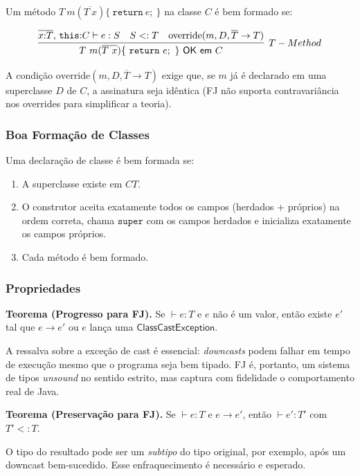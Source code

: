 Um método \(T\ m(\overline{T\ x})\{\ \mathtt{return}\ e;\ \}\) na
classe \(C\) é bem formado se:

\[ \infer[T-Method]{T\ m(\overline{T\ x})\{\ \mathtt{return}\ e;\ \}\
  \mathsf{OK}\ \mathsf{em}\ C}{\overline{x {:} T},\, \mathtt{this}
    {:} C \vdash e
: S \quad S <: T \quad \text{override}(m, D, \overline{T} \to T)} \]

A condição \(\text{override}(m, D, \overline{T} \to T)\) exige que,
se \(m\) já é declarado em uma superclasse \(D\) de \(C\), a
assinatura seja idêntica (FJ não suporta contravariância nos
overrides para simplificar a teoria).

\subsubsection{Boa Formação de Classes}

Uma declaração de classe é bem formada se:

\begin{enumerate}
  \item
    A superclasse existe em \(\mathit{CT}\).
  \item
    O construtor aceita exatamente todos os campos (herdados +
    próprios) na ordem correta, chama \(\mathtt{super}\) com os
    campos herdados e inicializa exatamente os campos próprios.
  \item
    Cada método é bem formado.
\end{enumerate}

\subsubsection{Propriedades}

\textbf{Teorema (Progresso para FJ).} Se \(\vdash e : T\) e \(e\) não
é um valor, então existe \(e'\) tal que \(e \to e'\) ou \(e\) lança
uma \(\mathsf{ClassCastException}\).

A ressalva sobre a exceção de cast é essencial: \emph{downcasts}
podem falhar em tempo de execução mesmo que o programa seja bem
tipado. FJ é, portanto, um sistema de tipos \emph{unsound} no sentido
estrito, mas captura com fidelidade o comportamento real de Java.

\textbf{Teorema (Preservação para FJ).} Se \(\vdash e : T\) e \(e \to
e'\), então \(\vdash e' : T'\) com \(T' <: T\).

O tipo do resultado pode ser um \emph{subtipo} do tipo original,
por exemplo, após um downcast bem-sucedido. Esse enfraquecimento é
necessário e esperado.

